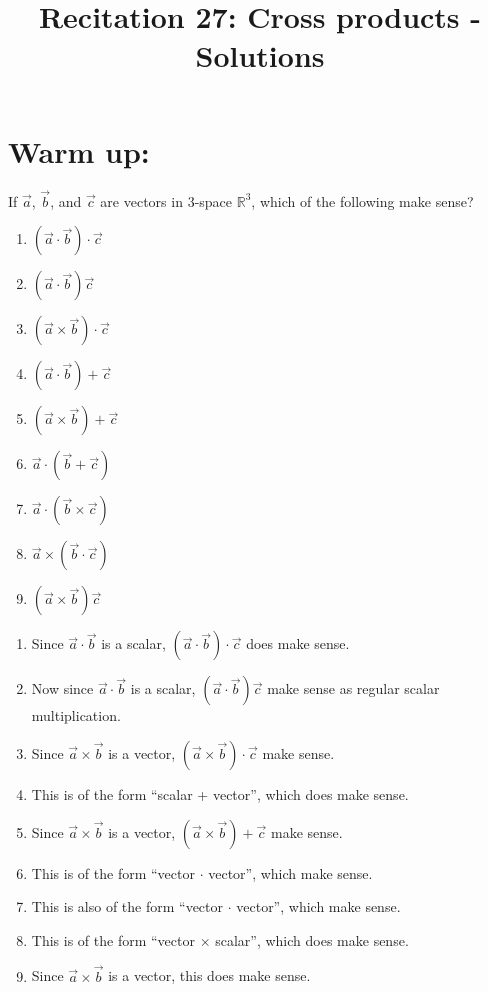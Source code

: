 \documentclass[noinstructornotes]{ximera}
\title{Recitation 27: Cross products - Solutions}
\begin{document}
\begin{abstract}		\end{abstract}
\maketitle



\section{Warm up:}
If $\vec{a}$, $\vec{b}$, and $\vec{c}$ are vectors in $3$-space $\mathbb{R}^3$, which of the following make sense?
	\begin{multicols}{3}
	\begin{enumerate}
	\item  $(\vec{a} \cdot \vec{b}) \cdot \vec{c}$
	\item  $(\vec{a} \cdot \vec{b})\vec{c}$
	\item  $(\vec{a} \times \vec{b}) \cdot \vec{c}$
	\item  $(\vec{a} \cdot \vec{b}) + \vec{c}$
	\item  $(\vec{a} \times \vec{b}) + \vec{c}$
	\item  $\vec{a} \cdot (\vec{b} + \vec{c})$
	\item  $\vec{a} \cdot (\vec{b} \times \vec{c})$
	\item  $\vec{a} \times (\vec{b} \cdot \vec{c})$
	\item  $(\vec{a} \times \vec{b}) \vec{c}$
	\end{enumerate}
	\end{multicols}
	
	\begin{freeResponse}
	\begin{enumerate}
	\item  Since $\vec{a} \cdot \vec{b}$ is a scalar, $(\vec{a} \cdot \vec{b}) \cdot \vec{c}$ does  make sense.
	\item  Now since $\vec{a} \cdot \vec{b}$ is a scalar, $(\vec{a} \cdot \vec{b})\vec{c}$  make sense as regular scalar multiplication.
	\item  Since $\vec{a} \times \vec{b}$ is a vector, $(\vec{a} \times \vec{b}) \cdot \vec{c}$  make sense.
	\item  This is of the form ``scalar + vector'', which does  make sense.
	\item  Since $\vec{a} \times \vec{b}$ is a vector, $(\vec{a} \times \vec{b}) + \vec{c}$  make sense.
	\item  This is of the form ``vector $\cdot$ vector'', which  make sense.
	\item  This is also of the form ``vector $\cdot$ vector'', which  make sense.
	\item  This is of the form ``vector $\times$ scalar'', which does  make sense.
	\item  Since $\vec{a} \times \vec{b}$ is a vector, this does  make sense.
	\end{enumerate}
	\end{freeResponse}
	
\end{document}
